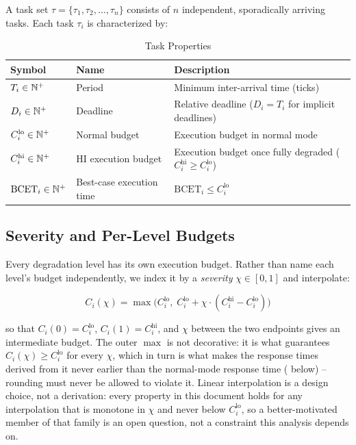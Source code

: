 A task set $\tau = \{\tau_1, \tau_2, \dots, \tau_n\}$ consists of $n$
independent, sporadically arriving tasks. Each task $\tau_i$ is characterized
by:

\begin{table}[h]
\centering
\caption{Task Properties}
\begin{tabular}{lll}
\toprule
Symbol & Name & Description \\
\midrule
$T_i \in \mathbb{N}^+$ & Period & Minimum inter-arrival time (ticks) \\
$D_i \in \mathbb{N}^+$ & Deadline & Relative deadline ($D_i = T_i$ for implicit deadlines) \\
$C_i^{\mathrm{lo}} \in \mathbb{N}^+$ & Normal budget & Execution budget in normal mode \\
$C_i^{\mathrm{hi}} \in \mathbb{N}^+$ & HI execution budget & Execution budget once fully degraded ($C_i^{\mathrm{hi}} \geq C_i^{\mathrm{lo}}$) \\
$\mathrm{BCET}_i \in \mathbb{N}^+$ & Best-case execution time & $\mathrm{BCET}_i \leq C_i^{\mathrm{lo}}$ \\
\bottomrule
\end{tabular}
\end{table}

\subsection{Severity and Per-Level Budgets}
\label{sec:severity-budgets}

Every degradation level has its own execution budget. Rather than name each
level's budget independently, we index it by a \emph{severity}
$\chi \in [0, 1]$ and interpolate:

\[
C_i(\chi) = \max\bigl(C_i^{\mathrm{lo}},\; C_i^{\mathrm{lo}} + \chi \cdot (C_i^{\mathrm{hi}} - C_i^{\mathrm{lo}})\bigr)
\]

so that $C_i(0) = C_i^{\mathrm{lo}}$, $C_i(1) = C_i^{\mathrm{hi}}$, and $\chi$
between the two endpoints gives an intermediate budget. The outer $\max$ is not
decorative: it is what guarantees $C_i(\chi) \geq C_i^{\mathrm{lo}}$ for every
$\chi$, which in turn is what makes the response times derived from it never
earlier than the normal-mode response time ( below) -- rounding
must never be allowed to violate it. Linear interpolation is a design choice,
not a derivation: every property in this document holds for any interpolation
that is monotone in $\chi$ and never below $C_i^{\mathrm{lo}}$, so a
better-motivated member of that family is an open question, not a constraint
this analysis depends on.

